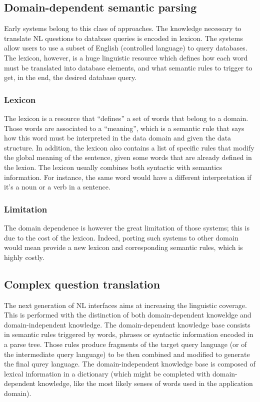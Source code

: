 \documentclass[10pt,journal,letterpaper,compsoc]{IEEEtran}
\begin{document}
\subsection{Domain-dependent semantic parsing}
Early systems belong to this class of approaches.
The knowledge necessary to translate NL questions to database queries
is encoded in lexicon.
The systems allow users to use a subset of English (controlled language) to
query databases. 
The lexicon, however, is a huge linguistic resource which defines how each word
must be translated into database elements, and what semantic rules to trigger to
get, in the end, the desired database query.



\subsubsection{Lexicon}
The lexicon is a resource that ``defines'' a set of words that belong to a
domain. Those words are associated to a ``meaning'', which is a semantic rule
that says how this word must be interpreted in the data domain and given
the data structure.
In addition, the lexicon also contains a list of specific rules that modify 
the global meaning of the sentence, given some words that are already defined in
the lexion.
The lexicon usually combines both syntactic with semantics information.
For instance, the same word would have a different interpretation if it's a noun
or a verb in a sentence. 

\subsubsection{Limitation}
The domain dependence is however the great limitation of those systems; this is
due to the cost of the lexicon. Indeed, porting such systems to other domain
would mean provide a new lexicon and corresponding semantic rules, which is
highly costly.


 







\subsection{Complex question translation}
The next generation of NL interfaces aims at increasing the linguistic coverage.
This is performed with the distinction of both domain-dependent knoweldge and
domain-independent knowledge.
The domain-dependent knowledge base consists in semantic rules triggered by
words, phrases or syntactic information encoded in a parse tree. Those rules
produce fragments of the target query language (or of the intermediate query
language) to be then combined and modified to generate the final qurey language.
The domain-independent knowledge base is composed of lexical information in a
dictionary (which might be completed with domain-dependent knowledge, like the
most likely senses of words used in the application domain).
\end{document}
